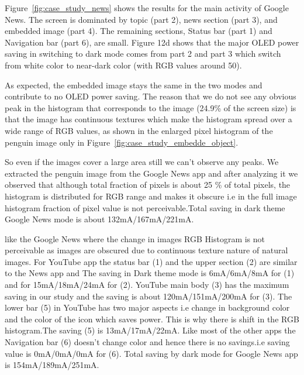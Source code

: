 Figure~\ref{fig:case_study_news} shows the results
for the main activity of Google News.  The screen is dominated by
topic (part 2), news section (part 3), and embedded image (part 4).
The remaining sections, Status bar (part 1) and Navigation bar (part
6), are small.
Figure 12d shows that the major OLED power saving in switching to dark mode comes from
part 2 and part 3 which switch from white color to near-dark color
(with RGB values around 50).

As expected, the embedded image stays the same
in the two modes and contribute to no OLED power saving. 
The reason that we do not see any obvious peak in the histogram that corresponds to
the image (24.9\% of the screen size) is that 
the image has continuous textures which make the histogram spread over
a wide range of RGB values, as shown in the enlarged pixel histogram of
the penguin image only in Figure~\ref{fig:case_study_embedde_object}.

So even if the images cover a large area still we
can't observe any peaks. We extracted the penguin image from the Google News
app and  after analyzing it we observed that although total fraction of pixels
is about 25 \% of total pixels, the histogram is distributed for RGB range and
makes it obscure i.e in the full image histogram fraction of pixel value is not
perceivable.Total saving in dark theme Google News mode is about 132mA/167mA/221mA.
\fi


like the Google News where the change in images RGB Histogram is not
perceivable as images are obscured due to continuous texture nature of
natural images. For YouTube app the status bar (1) and the upper section (2)
are similar to the News app and The saving in Dark theme mode is
6mA/6mA/8mA for (1) and for 15mA/18mA/24mA for (2). YouTube main body (3) has
the maximum saving in our study and the saving is about 120mA/151mA/200mA for (3).
The lower bar (5) in YouTube has two major aspects i.e change in background
color and the color of the icon which saves power. This is why there is shift
in the RGB histogram.The saving (5) is  13mA/17mA/22mA. Like most of the other
apps the Navigation bar (6) doesn't change color and hence there is no
savings.i.e saving value is 0mA/0mA/0mA for (6).
Total saving by dark mode for Google News app is 154mA/189mA/251mA.
\fi

% 

